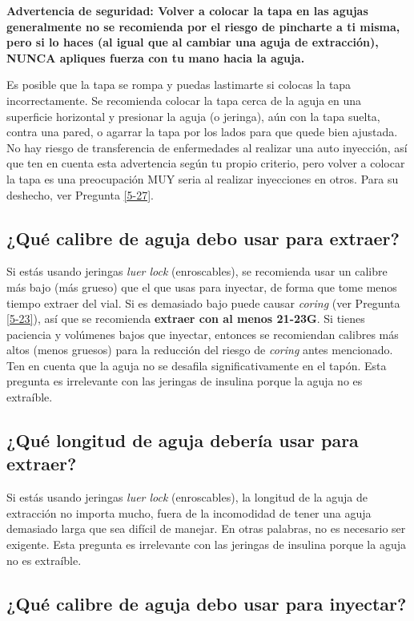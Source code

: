 \documentclass{article}
\begin{document}
\textbf{Advertencia de seguridad: Volver a colocar la tapa en las agujas generalmente no se recomienda por el riesgo de pincharte a ti misma, pero si lo haces (al igual que al cambiar una aguja de extracción), NUNCA apliques fuerza con tu mano hacia la aguja.}

Es posible que la tapa se rompa y puedas lastimarte si colocas la tapa incorrectamente. Se recomienda colocar la tapa cerca de la aguja en una superficie horizontal y presionar la aguja (o jeringa), aún con la tapa suelta, contra una pared, o agarrar la tapa por los lados para que quede bien ajustada. No hay riesgo de transferencia de enfermedades al realizar una auto inyección, así que ten en cuenta esta advertencia según tu propio criterio, pero volver a colocar la tapa es una preocupación MUY seria al realizar inyecciones en otros. Para su deshecho, ver Pregunta \ref{5-27}.

\subsection{¿Qué calibre de aguja debo usar para extraer?}

Si estás usando jeringas \textit{luer lock} (enroscables), se recomienda usar un calibre más bajo (más grueso) que el que usas para inyectar, de forma que tome menos tiempo extraer del vial. Si es demasiado bajo puede causar \textit{coring} (ver Pregunta \ref{5-23}), así que se recomienda \textbf{extraer con al menos 21-23G}. Si tienes paciencia y volúmenes bajos que inyectar, entonces se recomiendan calibres más altos (menos gruesos) para la reducción del riesgo de \textit{coring} antes mencionado. Ten en cuenta que la aguja no se desafila significativamente en el tapón. Esta pregunta es irrelevante con las jeringas de insulina porque la aguja no es extraíble.

\subsection{¿Qué longitud de aguja debería usar para extraer?}

Si estás usando jeringas \textit{luer lock} (enroscables), la longitud de la aguja de extracción no importa mucho, fuera de la incomodidad de tener una aguja demasiado larga que sea difícil de manejar. En otras palabras, no es necesario ser exigente. Esta pregunta es irrelevante con las jeringas de insulina porque la aguja no es extraíble.

\subsection{¿Qué calibre de aguja debo usar para inyectar?}\label{5-16}
\end{document}
